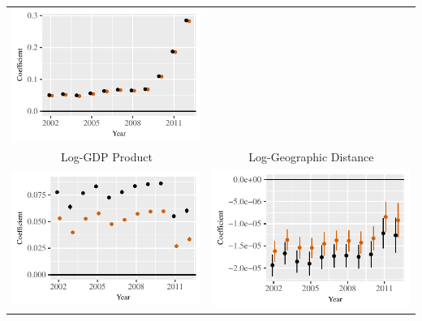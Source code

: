 \documentclass[reqno,onecolumn,letterpaper,12pt]{article}
\begin{document}
\begin{longtable}[!h]{c@{\hskip -.4cm}c}
\includegraphics[height=.2\textheight, clip=true, trim=.5cm .5cm 0cm .1cm]{draft_figures/rl_plots/LDV.pdf}   \\
Log-GDP Product &
Log-Geographic Distance\\
\includegraphics[height=.2\textheight, clip=true, trim=0cm .5cm 0cm .1cm]{draft_figures/rl_plots/GDP_Dyad.pdf}    &
\includegraphics[height=.2\textheight, clip=true, trim=.5cm .5cm 0cm .1cm]{draft_figures/rl_plots/Distance.pdf}   \\

\end{longtable}
\end{document}
